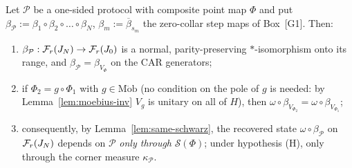 \documentclass[11pt]{article}
\newcommand{\Sch}{\mathcal S}
\newcommand{\Mob}{\operatorname{M\ddot ob}}
\newcommand{\Fr}{\cF_r}
\newcommand{\PP}{\mathcal P}
\theoremstyle{definition}\newtheorem{example}[theorem]{Example}
\begin{document}
\begin{theorem}\label{thm:state}
Let $\PP$ be a one-sided protocol with composite point map $\Phi$ and put
$\beta_\PP:=\beta_1\circ\beta_2\circ\dots\circ\beta_N$, $\beta_m:=\overline\beta_{s_m}$ the
zero-collar step maps of Box~[G1].  Then:
\begin{enumerate}[label=(\arabic*),leftmargin=2.2em]
\item $\beta_\PP:\Fr(J_N)\to\Fr(J_0)$ is a normal, parity-preserving $*$-isomorphism onto its
 range, and $\beta_\PP=\beta_{V_\Phi}$ on the CAR generators;
\item if $\Phi_2=g\circ\Phi_1$ with $g\in\Mob$ (no condition on the pole of $g$ is needed: by
 Lemma~\ref{lem:moebius-inv} $V_g$ is unitary on all of $H$), then
 $\omega\circ\beta_{V_{\Phi_2}}=\omega\circ\beta_{V_{\Phi_1}}$;
\item consequently, by Lemma~\ref{lem:same-schwarz}, the recovered state
 $\omega\circ\beta_\PP$ on $\Fr(J_N)$ depends on $\PP$ \emph{only through} $\Sch(\Phi)$; under
 hypothesis (H), only through the corner measure $\kappa_\PP$.
\end{enumerate}
\end{theorem}
\end{document}
